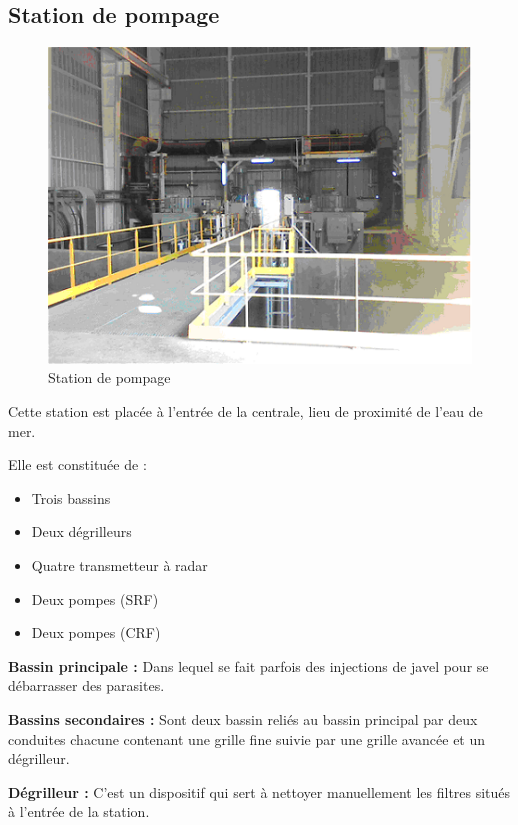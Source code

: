 \subsection{Station de pompage}
\begin{figure}[h]
\centering
\includegraphics[scale=0.7]{./Figures/stationpompage.png}
\caption{Station de pompage}
\end{figure}
Cette station est placée à l'entrée de la centrale, lieu de proximité de l'eau de mer.


Elle est constituée de : 

\begin{itemize}
\item Trois bassins
\item Deux dégrilleurs 
\item Quatre transmetteur à radar
\item Deux pompes (SRF)
\item Deux  pompes (CRF)

\end{itemize}

\textbf{Bassin principale : }Dans lequel se fait parfois des injections de javel pour se débarrasser des parasites.

\textbf{Bassins secondaires : }Sont deux bassin reliés au bassin principal par deux conduites chacune contenant une grille fine suivie par une grille avancée et un dégrilleur.

\textbf{Dégrilleur : } C'est un dispositif qui sert à nettoyer  manuellement les filtres situés à l'entrée de la station.                                                                                                          

